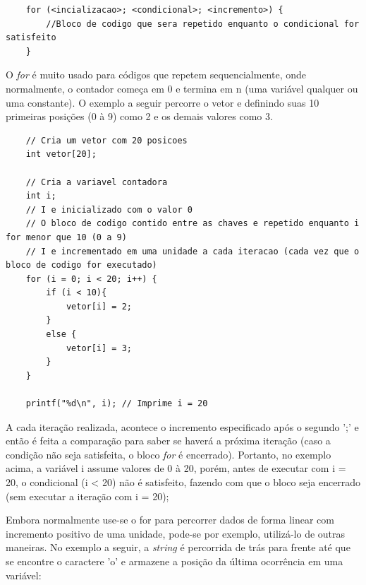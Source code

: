 \documentclass[12pt]{article}
\newcommand\tab[1][1cm]{\hspace*{#1}}
\begin{document}
\hspace{0.25cm}
\begin{lstlisting}
    for (<incializacao>; <condicional>; <incremento>) {
        //Bloco de codigo que sera repetido enquanto o condicional for satisfeito
    }
\end{lstlisting}

\par\tab O \textit{for} é muito usado para códigos que repetem sequencialmente, onde normalmente, o contador começa em 0 e termina em n (uma variável qualquer ou uma constante)\cite{site:for}\cite{site:for_vs}. O exemplo a seguir percorre o vetor e definindo suas 10 primeiras posições (0 à 9) como 2 e os demais valores como 3.

\hspace{0.25cm}
\begin{lstlisting}
    // Cria um vetor com 20 posicoes
    int vetor[20];

    // Cria a variavel contadora
    int i;
    // I e inicializado com o valor 0
    // O bloco de codigo contido entre as chaves e repetido enquanto i for menor que 10 (0 a 9)
    // I e incrementado em uma unidade a cada iteracao (cada vez que o bloco de codigo for executado)
    for (i = 0; i < 20; i++) {
        if (i < 10){
            vetor[i] = 2;
        }
        else {
            vetor[i] = 3;
        }
    }
    
    printf("%d\n", i); // Imprime i = 20
\end{lstlisting}

\hspace{0.25cm}
\begin{tcolorbox}[colback=green!5!white,colframe=green!75!black,title=Curiosidade]
  \par\tab A cada iteração realizada, acontece o incremento especificado após o segundo ';' e então é feita a comparação para saber se haverá a próxima iteração (caso a condição não seja satisfeita, o bloco \textit{for} é encerrado). Portanto, no exemplo acima, a variável i assume valores de 0 à 20, porém, antes de executar com i = 20, o condicional (i < 20) não é satisfeito, fazendo com que o bloco seja encerrado (sem executar a iteração com i = 20);
\end{tcolorbox}

\par\tab Embora normalmente use-se o for para percorrer dados de forma linear com incremento positivo de uma unidade, pode-se por exemplo, utilizá-lo de outras maneiras. No exemplo a seguir, a \textit{string} é percorrida de trás para frente até que se encontre o caractere 'o' e armazene a posição da última ocorrência em uma variável:
\end{document}
